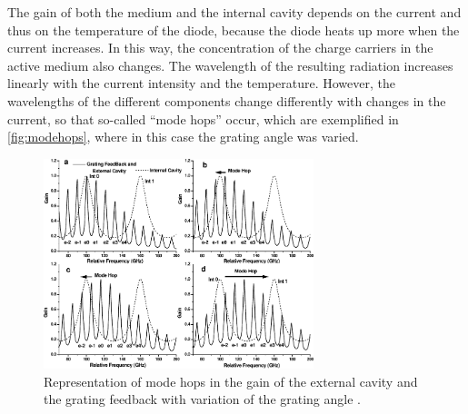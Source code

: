 \label{sec:theorie:modehops}
The gain of both the medium and the internal cavity depends on the current and thus on the temperature of the diode,
because the diode heats up more when the current increases.
In this way, the concentration of the charge carriers in the active medium also changes.
The wavelength of the resulting radiation increases linearly with the current intensity and the temperature.
However,
the wavelengths of the different components change differently with changes in the current,
so that so-called \enquote{mode hops} occur,
which are exemplified in \autoref{fig:modehops},
where in this case the grating angle was varied.
\begin{figure}
    \centering
    \includegraphics[width=0.7\textwidth]{content/img/p13_Fig9.pdf}
    \caption{
        Representation of mode hops in the gain of the external cavity
        and the grating feedback with variation of the grating angle
        \cite{versuchsanleitung}.
    }
    \label{fig:modehops}
\end{figure}
